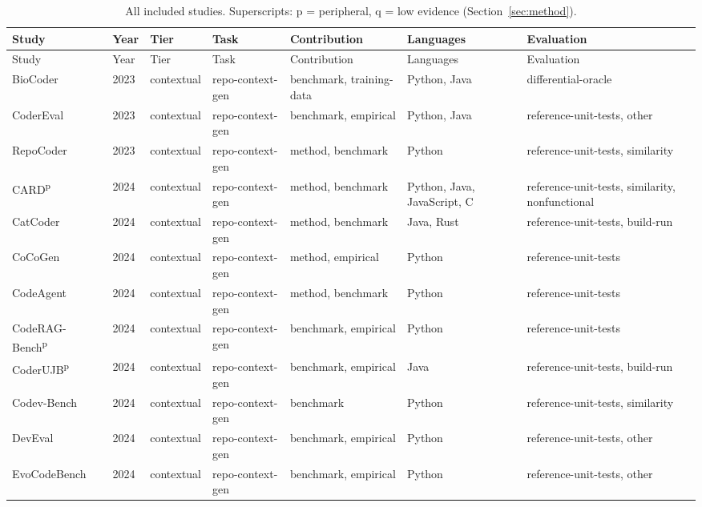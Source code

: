 {\scriptsize
\begin{longtable}{@{}p{2.8cm}lllp{1.9cm}p{1.5cm}p{2.9cm}@{}}
\caption{All included studies. Superscripts: p = peripheral, q = low evidence (Section~\ref{sec:method}).}\\
\toprule Study & Year & Tier & Task & Contribution & Languages & Evaluation \\ \midrule \endfirsthead
\toprule Study & Year & Tier & Task & Contribution & Languages & Evaluation \\ \midrule \endhead
BioCoder~\cite{BioCoder2023} & 2023 & contextual & repo-context-gen & benchmark, training-data & Python, Java & differential-oracle \\
CoderEval~\cite{CoderEval2023} & 2023 & contextual & repo-context-gen & benchmark, empirical & Python, Java & reference-unit-tests, other \\
RepoCoder~\cite{RepoCoder2023} & 2023 & contextual & repo-context-gen & method, benchmark & Python & reference-unit-tests, similarity \\
CARD\textsuperscript{p}~\cite{CARD2024} & 2024 & contextual & repo-context-gen & method, benchmark & Python, Java, JavaScript, C & reference-unit-tests, similarity, nonfunctional \\
CatCoder~\cite{CatCoder2024} & 2024 & contextual & repo-context-gen & method, benchmark & Java, Rust & reference-unit-tests, build-run \\
CoCoGen~\cite{CoCoGen2024} & 2024 & contextual & repo-context-gen & method, empirical & Python & reference-unit-tests \\
CodeAgent~\cite{CodeAgent2024} & 2024 & contextual & repo-context-gen & method, benchmark & Python & reference-unit-tests \\
CodeRAG-Bench\textsuperscript{p}~\cite{CodeRAGBench2024} & 2024 & contextual & repo-context-gen & benchmark, empirical & Python & reference-unit-tests \\
CoderUJB\textsuperscript{p}~\cite{CoderUJB2024} & 2024 & contextual & repo-context-gen & benchmark, empirical & Java & reference-unit-tests, build-run \\
Codev-Bench~\cite{CodevBench2024} & 2024 & contextual & repo-context-gen & benchmark & Python & reference-unit-tests, similarity \\
DevEval~\cite{DevEval2024} & 2024 & contextual & repo-context-gen & benchmark, empirical & Python & reference-unit-tests, other \\
EvoCodeBench~\cite{EvoCodeBench2024} & 2024 & contextual & repo-context-gen & benchmark, empirical & Python & reference-unit-tests, other \\

\end{longtable}}
